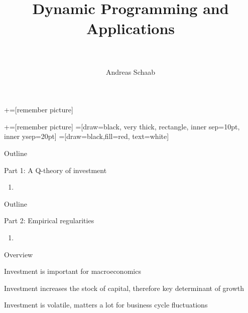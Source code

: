 \documentclass[11pt, aspectratio=169]{beamer}
\title[]{\\[8pt]
	{\large \color{blue} Dynamic Programming and Applications \\[5pt] \normalfont{Applications} \\[10pt] \normalfont{Lecture 7}}}
\author[Schaab]{Andreas Schaab}
\institute{}
\date{}
\newenvironment{witemize}{\itemize\addtolength{\itemsep}{10pt}}{\enditemize}
\begin{document}
+=[remember picture]

\newcommand\marktopleft[1]{%
	\tikz[overlay,remember picture] 
	\node (marker-#1-a) at (-.3em,.3em) {};%
}
\newcommand\markbottomright[2]{%
	\tikz[overlay,remember picture] 
	\node (marker-#1-b) at (0em,0em) {};%
}
+=[remember picture] 
 =[draw=black, very thick, rectangle, inner sep=10pt, inner ysep=20pt]
 =[draw=black,fill=red, text=white]


\addtocounter{framenumber}{-1}
\thispagestyle{empty}
\maketitle 
\newpage




\begin{frame}{Outline}
\thispagestyle{empty}
\addtocounter{framenumber}{-1}

Part 1: A Q-theory of investment
\begin{enumerate}
	\item 
\end{enumerate}

\end{frame}


\begin{frame}{Outline}
\thispagestyle{empty}
\addtocounter{framenumber}{-1}

Part 2: Empirical regularities 
\begin{enumerate}
	\item 
\end{enumerate}

\end{frame}


\begin{frame}{Overview}
\begin{witemize}
\item Investment is important for macroeconomics

\item Investment increases the stock of capital, therefore key determinant of growth

\item Investment is volatile, matters a lot for business cycle fluctuations

\end{witemize}
\end{frame}
\end{document}
